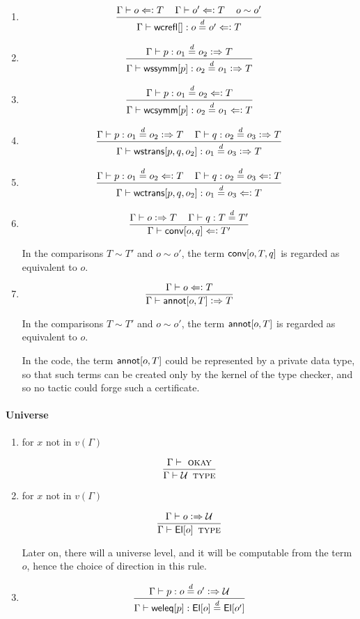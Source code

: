 \documentclass[11pt]{article}
\newcommand{\eqd}{\stackrel{d}{=}}
\newcommand{\Eu}{{\cal U}}
\newcommand{\spc}{{\,\,\,\,\,\,\,}}
\newcommand{\synth}{\vcentcolon\Rightarrow}
\newcommand{\ccheck}{\Leftarrow\vcentcolon}
\newcommand{\Type}{\mathop{\text{ \sc type}}}
\newcommand{\Okay}{\mathop{\text{ \sc okay}}}
\newcommand{\ha}[2]{#1[#2]}
\newcommand{\El}{{\sf El}}
\newcommand{\annot}{{\sf annot}}
\newcommand{\conv}{{\sf conv}}
\newcommand{\weleq}{{\sf weleq}}
\newcommand{\wcrefl}{{\sf wcrefl}}
\newcommand{\wssymm}{{\sf wssymm}}
\newcommand{\wcsymm}{{\sf wcsymm}}
\newcommand{\wstrans}{{\sf wstrans}}
\newcommand{\wctrans}{{\sf wctrans}}
\begin{document}
\begin{enumerate}
\item 
$$\frac{\Gamma\vdash o \ccheck T\spc\Gamma\vdash o' \ccheck T \spc o \sim o'}{\Gamma\vdash \ha\wcrefl{}:o\eqd o' \ccheck T}$$

\item 
$$\frac{\Gamma\vdash p:o_1\eqd o_2 \synth T}{\Gamma\vdash \ha\wssymm{p}:o_2\eqd o_1 \synth T}$$

\item 
$$\frac{\Gamma\vdash p:o_1\eqd o_2 \ccheck T}{\Gamma\vdash \ha\wcsymm{p}:o_2\eqd o_1 \ccheck T}$$

\item 
$$\frac{\Gamma\vdash p:o_1\eqd o_2 \synth T\spc\Gamma\vdash q:o_2\eqd o_3 \synth T}{\Gamma\vdash \ha\wstrans{p,q,o_2}:o_1\eqd o_3 \synth T}$$

\item 
$$\frac{\Gamma\vdash p:o_1\eqd o_2 \ccheck T\spc\Gamma\vdash q:o_2\eqd o_3 \ccheck T}{\Gamma\vdash \ha\wctrans{p,q,o_2}:o_1\eqd o_3 \ccheck T}$$

\item 
$$\frac{\Gamma\vdash o \synth T\spc \Gamma\vdash q : T \eqd T'}{\Gamma\vdash \ha\conv{o,q} \ccheck T'}$$

In the comparisons $T\sim T'$ and $o\sim o'$, the term $\ha\conv{o,T,q}$ is regarded as equivalent to $o$.

\item 
$$\frac{\Gamma\vdash o \ccheck T}{\Gamma\vdash \ha\annot{o,T} \synth T}$$

In the comparisons $T\sim T'$ and $o\sim o'$, the term $\ha\annot{o,T}$ is regarded as equivalent to $o$.

In the code, the term $\ha\annot{o,T}$ could be represented by a private data
type, so that such terms can be created only by the kernel of the type checker,
and so no tactic could forge such a certificate.

\end{enumerate}

\paragraph{Universe}

\begin{enumerate}

\item for $x$ not in $v(\Gamma)$

$$\frac{\Gamma\vdash\Okay}{\Gamma \vdash \Eu\Type}$$

\item for $x$ not in $v(\Gamma)$

$$\frac{\Gamma\vdash o \synth \Eu}{\Gamma \vdash \ha\El{o}\Type}$$

Later on, there will a universe level, and it will be computable from the
term $o$, hence the choice of direction in this rule.

\item 

$$\frac{\Gamma\vdash p : o \eqd o' \synth \Eu}{\Gamma\vdash \ha\weleq{p} : \ha\El{o} \eqd \ha\El{o'}}$$

\end{enumerate}
\end{document}
